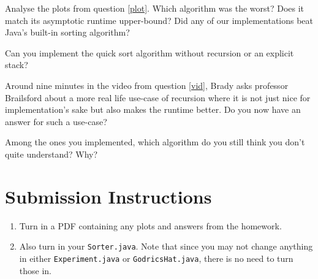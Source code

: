 \documentclass{homework}
\begin{document}
\question Analyse the plots from question \ref{plot}. Which algorithm was the worst? Does it match its asymptotic runtime upper-bound? Did any of our implementations beat Java's built-in sorting algorithm?

\question Can you implement the quick sort algorithm without recursion or an
explicit stack?

\question Around nine minutes in the video from question \ref{vid}, Brady asks professor Brailsford about a more real life use-case of recursion where it is not just nice for implementation's sake but also makes the runtime better. Do you now have an answer for such a use-case?

\question Among the ones you implemented, which algorithm do you still think
you don't quite understand? Why?

\section*{Submission Instructions}

\begin{enumerate}
  \item Turn in a PDF containing any plots and answers from the homework.
  \item Also turn in your \texttt{Sorter.java}. Note that since you may
        not change anything in either \texttt{Experiment.java} or
        \texttt{GodricsHat.java}, there is no need to turn those in.
\end{enumerate}
\end{document}
